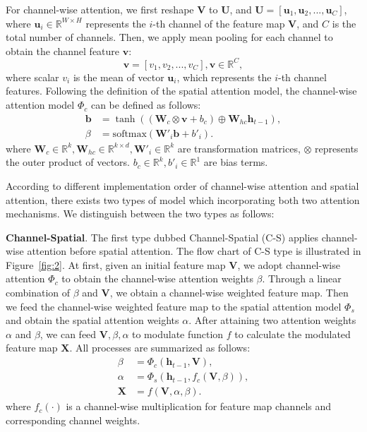 \documentclass[10pt,twocolumn,letterpaper]{article}
\begin{document}
For channel-wise attention, we first reshape $\mathbf{V}$ to $\mathbf{U}$, and $ \mathbf{U} = [\mathbf{u}_1, \mathbf{u}_2, ..., \mathbf{u}_C]$, where $
\mathbf{u}_i \in \mathbb{R}^{W \times H}$ represents the $i$-th channel of the feature map $\mathbf{V}$, and $C$ is the total number of channels. Then, we
apply mean pooling for each channel to obtain the channel feature $\mathbf{v}$:
\begin{equation}
\mathbf{v} = \left[v_1, v_2, ..., v_C \right], \mathbf{v} \in \mathbb{R}^{C},
\end{equation}
where scalar $v_i$ is the mean of vector $\mathbf{u}_i$, which represents the $i$-th channel features. Following the definition of the spatial attention
model, the channel-wise attention model $\Phi_c$ can be defined as follows:
\begin{equation} \label{equ:C}
\begin{split}
\mathbf{b} & = \tanh \left(\left(\mathbf{W}_c \otimes \mathbf{v} + b_c \right) \oplus \mathbf{W}_{hc}\mathbf{h}_{t-1} \right), \\
\beta & = \textrm{softmax} \left(\mathbf{W'}_i \mathbf{b} + {b'}_i \right).
\end{split}
\end{equation}
where $\mathbf{W}_c \in \mathbb{R}^k, \mathbf{W}_{hc} \in \mathbb{R}^{k \times d}, \mathbf{W'}_i \in \mathbb{R}^k$ are transformation matrices, $\otimes$
represents the outer product of vectors. $b_c \in \mathbb{R}^k, {b'}_i \in \mathbb{R}^1$ are bias terms.

According to different implementation order of channel-wise attention and spatial attention, there exists two types of model which incorporating both two
attention mechanisms. We distinguish between the two types as follows:

\textbf{Channel-Spatial}. The first type dubbed Channel-Spatial (C-S) applies channel-wise attention before spatial attention. The flow chart of C-S type is
illustrated in Figure~\ref{fig:2}. At first, given an initial feature map $\mathbf{V}$, we adopt channel-wise attention $\Phi_c$ to obtain the channel-wise
attention weights $\beta$. Through a linear combination of $\beta$ and $\mathbf{V}$, we obtain a channel-wise weighted feature map. Then we feed the
channel-wise weighted feature map to the spatial attention model $\Phi_s$ and obtain the spatial attention weights $\alpha$. After attaining two attention
weights $\alpha$ and $\beta$, we can feed $\mathbf{V}, \beta, \alpha$ to modulate function $f$ to calculate the modulated feature map $\mathbf{X}$. All
processes are summarized as follows:
\begin{equation} \label{equ:C-S}
\begin{split}
\beta &= \Phi_c \left(\mathbf{h}_{t-1},\mathbf{V} \right), \\
\alpha &= \Phi_s \left(\mathbf{h}_{t-1}, f_c \left(\mathbf{V}, \beta \right) \right), \\
\mathbf{X} &= f \left(\mathbf{V}, \alpha, \beta \right).
\end{split}
\end{equation}
where $f_c(\cdot)$ is a channel-wise multiplication for feature map channels and corresponding channel weights.
\end{document}
